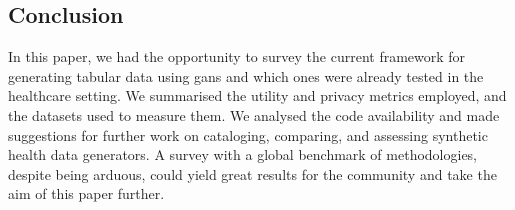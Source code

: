 \subsection{Conclusion}
In this paper, we had the opportunity to survey the current framework for generating tabular data using \acp{gan} and which ones were already tested in the healthcare setting. We summarised the utility and privacy metrics employed, and the datasets used to measure them. We analysed the code availability and made suggestions for further work on cataloging, comparing, and assessing synthetic health data generators. A survey with a global benchmark of methodologies, despite being arduous, could yield great results for the community and take the aim of this paper further.